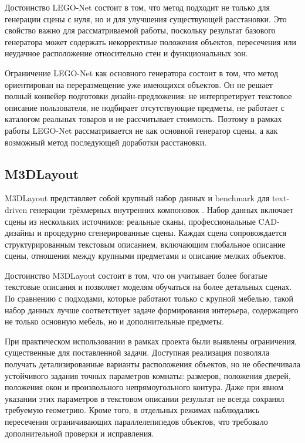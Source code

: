 \documentclass[times]{itmo-student-thesis}
\begin{document}
Достоинство LEGO-Net состоит в том, что метод подходит не только для генерации сцены с нуля, но и для улучшения существующей расстановки. Это свойство важно для рассматриваемой работы, поскольку результат базового генератора может содержать некорректные положения объектов, пересечения или неудачное расположение относительно стен и функциональных зон.

Ограничение LEGO-Net как основного генератора состоит в том, что метод ориентирован на переразмещение уже имеющихся объектов. Он не решает полный конвейер подготовки дизайн-предложения: не интерпретирует текстовое описание пользователя, не подбирает отсутствующие предметы, не работает с каталогом реальных товаров и не рассчитывает стоимость. Поэтому в рамках работы LEGO-Net рассматривается не как основной генератор сцены, а как возможный метод последующей доработки расстановки.

\subsection{M3DLayout}

M3DLayout представляет собой крупный набор данных и benchmark для text-driven генерации трёхмерных внутренних компоновок \cite{zhang2025m3dlayout}. Набор данных включает сцены из нескольких источников: реальные сканы, профессиональные CAD-дизайны и процедурно сгенерированные сцены. Каждая сцена сопровождается структурированным текстовым описанием, включающим глобальное описание сцены, отношения между крупными предметами и описание мелких объектов.

Достоинство M3DLayout состоит в том, что он учитывает более богатые текстовые описания и позволяет моделям обучаться на более детальных сценах. По сравнению с подходами, которые работают только с крупной мебелью, такой набор данных лучше соответствует задаче формирования интерьера, содержащего не только основную мебель, но и дополнительные предметы.

При практическом использовании в рамках проекта были выявлены ограничения, существенные для поставленной задачи. Доступная реализация позволяла получать детализированные варианты расположения объектов, но не обеспечивала устойчивого задания точных параметров комнаты: размеров, положения дверей, положения окон и произвольного непрямоугольного контура. Даже при явном указании этих параметров в текстовом описании результат не всегда сохранял требуемую геометрию. Кроме того, в отдельных режимах наблюдались пересечения ограничивающих параллелепипедов объектов, что требовало дополнительной проверки и исправления.
\end{document}
